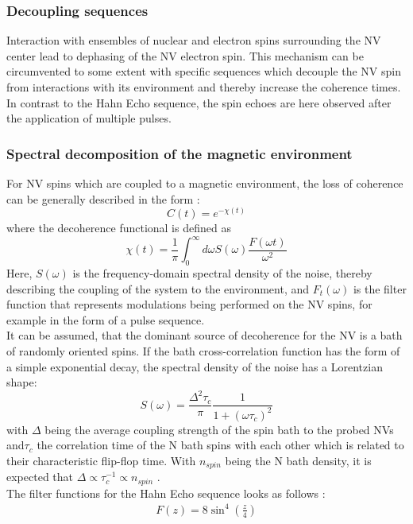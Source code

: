 \documentclass[12pt,a4paper]{article}
\begin{document}
\subsubsection{Decoupling sequences}\label{Ds}
Interaction with ensembles of nuclear and electron spins surrounding the NV center lead to dephasing of the NV electron spin. This mechanism can be circumvented to some extent with specific sequences which decouple the NV spin from interactions with its environment and thereby increase the coherence times. In contrast to the Hahn Echo sequence, the spin echoes are here observed after the application of multiple pulses.
\subsubsection*{Spectral decomposition of the magnetic environment}
For NV spins which are coupled to a magnetic environment, the loss of coherence can be generally described  in the form \cite{ssbd}:
\begin{equation}
C(t)=e^{-\chi(t)}
\end{equation}
where the decoherence functional is defined as
\begin{equation}\label{chi}
\chi(t)=\frac{1}{\pi}\int^{\infty}_0d\omega S(\omega)\frac{F(\omega t)}{\omega^2}
\end{equation}
Here, $S(\omega)$ is the frequency-domain spectral density of the noise, thereby describing the coupling of the system to the environment, and $F_t(\omega)$ is the filter function that represents modulations being performed on the NV spins, for example in the form of a pulse sequence.\\
It can be assumed, that the dominant source of decoherence for the NV is a bath of randomly oriented spins\cite{ssbd}. If the bath cross-correlation function has the form of a simple exponential decay, the spectral density of the noise has a Lorentzian shape:
\begin{equation}\label{SD}
S(\omega)=\frac{\Delta^2\tau_c}{\pi}\frac{1}{1+(\omega\tau_c)^2}
\end{equation}
with $\Delta$ being the average coupling strength  of the spin bath to the probed NVs and$\tau_c$ the correlation time of the N bath spins with each other which is related to their characteristic flip-flop time. With $n_{spin}$ being the N bath density, it is expected that $\Delta\propto\tau_c^{-1}\propto n_{spin}$  \cite{ssbd}.\\
The filter functions for the Hahn Echo sequence looks as follows \cite{hted}:
\begin{align}
F(z)=8\sin^4\left(\frac{z}{4}\right)
\end{align}
\end{document}
